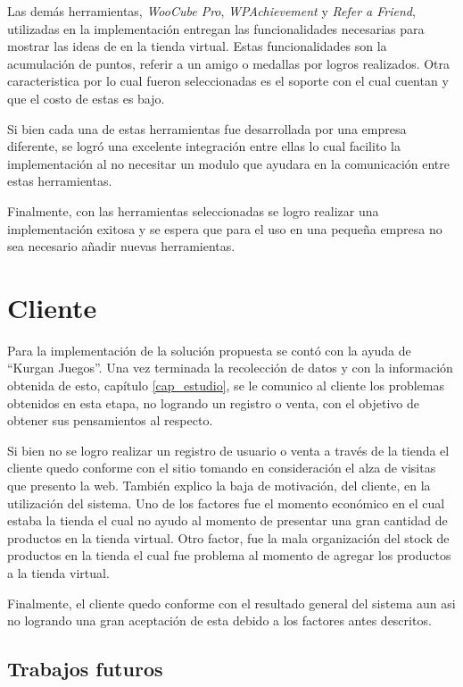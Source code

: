 Las demás herramientas, \emph{WooCube Pro}, \emph{WPAchievement} y \emph{Refer a Friend}, utilizadas en la 
implementación entregan las funcionalidades necesarias para mostrar las ideas de {\gam} en la tienda virtual. Estas funcionalidades son la acumulación de puntos, referir a un amigo o medallas por logros realizados. Otra caracteristica por
lo cual fueron seleccionadas es el soporte con el cual cuentan y que el costo de estas es bajo.

Si bien cada una de estas herramientas fue desarrollada por una empresa diferente, se logró una excelente
integración entre ellas lo cual facilito la implementación al no necesitar un modulo que ayudara en la comunicación
entre estas herramientas.

Finalmente, con las herramientas seleccionadas se logro realizar una implementación exitosa y se espera que para
el uso en una pequeña empresa no sea necesario añadir nuevas herramientas.

\section{Cliente}

Para la implementación de la solución propuesta se contó con la ayuda de ``Kurgan Juegos''. Una vez terminada
la recolección de datos y con la información obtenida de esto, capítulo \ref{cap_estudio}, se le comunico
al cliente los problemas obtenidos en esta etapa, no logrando un registro o venta, con el objetivo de obtener
sus pensamientos al respecto.

Si bien no se logro realizar un registro de usuario o venta a través de la tienda el cliente quedo conforme con
el sitio tomando en consideración el alza de visitas que presento la web. También explico la baja de motivación,
del cliente, en la utilización del sistema. Uno de los factores fue el momento económico en el cual estaba la tienda
el cual no ayudo al momento de presentar una gran cantidad de productos en la tienda virtual. Otro factor, fue la
mala organización del stock de productos en la tienda el cual fue problema al momento de agregar los productos
a la tienda virtual.

Finalmente, el cliente quedo conforme con el resultado general del sistema aun asi no logrando una gran aceptación 
de esta debido a los factores antes descritos.

\subsection{Trabajos futuros}

